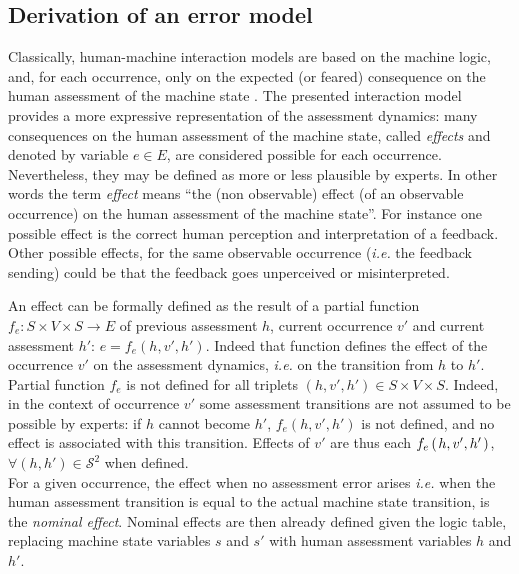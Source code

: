 \subsection{Derivation of an error model}
Classically, human-machine interaction models 
are based on the machine logic, 
and, for each occurrence, only on the expected (or feared) 
consequence on the human assessment of the machine state 
\cite{rushby02a, pizziol14}. 
The presented interaction model provides 
a more expressive representation of the assessment dynamics: 
many consequences on the human assessment of the machine state, called {\em effects} 
and denoted by variable $e \in E $, are considered possible 
for each occurrence. Nevertheless, they may be defined as more 
or less plausible by experts. In other words the 
term {\em effect} means ``the (non observable) effect 
(of an observable occurrence) on the human assessment 
of the machine state''. For instance one possible effect 
is the correct human perception and interpretation of a feedback. 
Other possible effects, for the same observable occurrence 
(\textit{i.e.} the feedback sending) could be that the feedback goes unperceived or misinterpreted.

An effect can be formally defined as the result of a partial 
function $ f_e : S \times V \times S \rightarrow E $ of previous assessment $h$, current occurrence $v'$ and current assessment $h'$: 
$e = f_e(h,v',h')$. Indeed that function defines the effect of the occurrence 
$v'$ on the assessment dynamics, \textit{i.e.} on the transition 
from $h$ to $h'$. Partial function $f_e$ is not defined for all 
triplets $(h,v',h') \in S \times V \times S$. Indeed, in the 
context of occurrence $v'$ some assessment transitions are not 
assumed to be possible by experts:
if $h$ cannot become $h'$, $f_e(h,v',h')$ is not defined, and no effect 
is associated with this transition.
Effects of $v'$ are thus each $f_e \left( \left.  h,v',h' \right. \right)$, 
$\forall (h,h') \in \mathcal{S}^2$ when defined.\\

For a given occurrence, the effect when no assessment error arises 
\textit{i.e.} when the human assessment transition 
is equal to the actual machine state transition,
is the {\em nominal effect}.
Nominal effects are then already defined given the logic
table, replacing machine state variables $s$ and $s'$ 
with human assessment variables $h$ and $h'$.  


